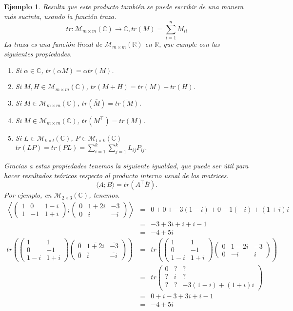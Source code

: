 \documentclass[12pt]{book}
\newtheorem{ejem}{Ejemplo}
\def\R{\mathbb{R}}
\def\C{\mathbb{C}}
\def\M{\mathcal{M}}
\begin{document}
{\begin{ejem}
{Resulta que este producto también se puede escribir de una manera más sucinta, usando la función \emph{traza}.
$$tr:\M_{m\times m}(\C)\rightarrow \C, tr(M)=\sum_{i=1}^n M_{ii}$$
La traza es una función lineal de $\M_{m\times m}(\R)$ en $\R$, que cumple con las siguientes propiedades.
\begin{enumerate}
\item Si $\alpha\in\C$, $tr(\alpha M)=\alpha tr(M)$.
\item Si $M, H\in\M_{m\times m}(\C)$, $tr(M+H)=tr(M)+tr(H)$.
\item Si $M\in\M_{m\times m}(\C)$, $tr(\overline{M})=\overline{tr(M)}$.
\item Si $M\in\M_{m\times m}(\C)$, $tr(M^\top)=tr(M)$.
\item Si $L\in\M_{k\times l}(\C)$, $P\in\M_{l\times k}(\C)$ $tr(LP)=tr(PL)=\sum_{i=1}^k\sum_{j=1}^k L_{ij}P_{ij}$.
\end{enumerate}
Gracias a estas propiedades tenemos la siguiente igualdad, que puede ser útil para hacer resultados teóricos respecto al producto interno usual de las matrices.
$$\langle A;B\rangle=tr(A^\top \overline{B}).$$
Por ejemplo, en $\M_{2\times 3}(\C)$, tenemos.
\begin{eqnarray*}
\left\langle \left(\begin{array}{ccc} 1&0&1-i\\1&-1&1+i\end{array}\right); \left(\begin{array}{ccc} 0&1+2i&-3\\0&i&-i\end{array}\right)\right\rangle&=& 0+0+-3(1-i)+0-1(-i)+(1+i)i\\
&=& -3+3i+i+i-1\\
&=& -4+5i\\
tr\left(\left(\begin{array}{cc} 1&1\\0&-1\\1-i&1+i\end{array}\right) \left(\begin{array}{ccc} \overline{0}&\overline{1+2i}&\overline{-3}\\\overline{0}&\overline{i}&\overline{-i}\end{array}\right)\right)
&=&tr\left(\left(\begin{array}{cc} 1&1\\0&-1\\1-i&1+i\end{array}\right) \left(\begin{array}{ccc} 0& 1-2i&-3\\ 0&-i&i\end{array}\right)\right)\\
&=&tr\left(\begin{array}{ccc} 0&?&?\\ ?& i & ?\\? & ? & -3(1-i)+(1+i)i \end{array}\right)\\
&=&0+i-3 +3i+i-1\\
&=&-4+5i
\end{eqnarray*}

}
\end{ejem}}
\end{document}
